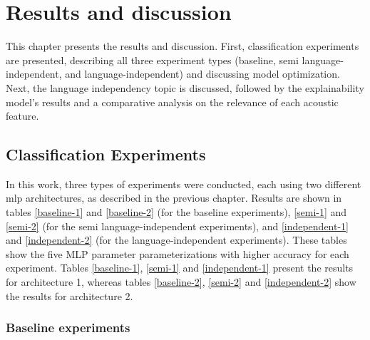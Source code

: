 
\chapter{Results and discussion}
\label{ch:omnisvoluptas}



This chapter presents the results and discussion. First, classification experiments are presented, describing all three experiment types (baseline, semi language-independent, and language-independent) and discussing model optimization. Next, the language independency topic is discussed, followed by the explainability model's results and a comparative analysis on the relevance of each acoustic feature.


\section{Classification Experiments}

In this work, three types of experiments were conducted, each using two different \gls{mlp} architectures, as described in the previous chapter. Results are shown in tables \ref{baseline-1} and \ref{baseline-2} (for the baseline experiments), \ref{semi-1} and \ref{semi-2} (for the semi language-independent experiments), and \ref{independent-1} and \ref{independent-2} (for the language-independent experiments). These tables show the five MLP parameter parameterizations with higher accuracy for each experiment. Tables \ref{baseline-1}, \ref{semi-1} and \ref{independent-1} present the results for architecture 1, whereas tables \ref{baseline-2}, \ref{semi-2} and \ref{independent-2} show the results for architecture 2.

\subsection{Baseline experiments}

